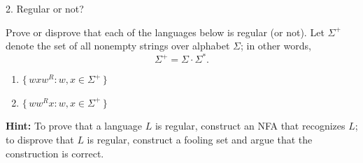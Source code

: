 \documentclass[12pt]{article}
\begin{document}
\begin{problem}{2. Regular or not?}

Prove or disprove that each of the languages below is regular (or not). Let $\Sigma^{+}$ denote the set of all nonempty strings over alphabet $\Sigma$; in other words,
\[
\Sigma^{+} = \Sigma \cdot \Sigma^{*}.
\]

\begin{enumerate}
    \item[(a)] 
    $\{\, wxw^{R} : w, x \in \Sigma^{+} \,\}$
    
    \item[(b)]
    $\{\, ww^{R}x : w, x \in \Sigma^{+} \,\}$
\end{enumerate}

\noindent
\textbf{Hint:} To prove that a language $L$ is regular, construct an NFA that recognizes $L$; to disprove that $L$ is regular, construct a fooling set and argue that the construction is correct.
\end{problem}
\end{document}
